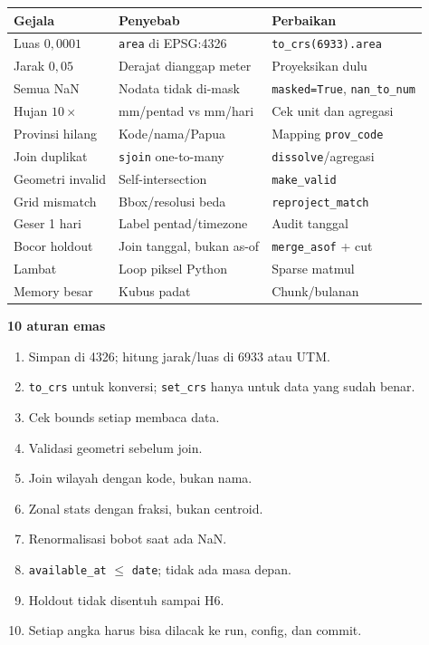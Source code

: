 \documentclass[9pt,a4paper]{extarticle}
\newcommand{\code}[1]{\texttt{\small\color{ink}#1}}
\newcommand{\thead}[1]{\textbf{\color{ink}#1}}
\newenvironment{csbox}[1]
  {\begin{tcolorbox}[enhanced,breakable,colback=tealbg,colframe=tealbg,boxrule=0pt,arc=1.1mm,
    left=3mm,right=2.2mm,top=1.4mm,bottom=1.4mm,borderline west={2.2pt}{0pt}{accent},
    before skip=3pt,after skip=3pt]
   \textcolor{accent}{\sffamily\bfseries #1}\par\vspace{0.5pt}}
  {\end{tcolorbox}}
\begin{document}
\begin{center}
\footnotesize
\begin{tabularx}{\linewidth}{@{}>{\RaggedRight\arraybackslash}p{4.1cm}>{\RaggedRight\arraybackslash}p{5.0cm}>{\RaggedRight\arraybackslash}X@{}}
\toprule
\rowcolor{bg}\thead{Gejala} & \thead{Penyebab} & \thead{Perbaikan}\\
\midrule
Luas $0{,}0001$ & \code{area} di EPSG:4326 & \code{to\_crs(6933).area}\\
Jarak $0{,}05$ & Derajat dianggap meter & Proyeksikan dulu\\
Semua NaN & Nodata tidak di-mask & \code{masked=True}, \code{nan\_to\_num}\\
Hujan $10\times$ & mm/pentad vs mm/hari & Cek unit dan agregasi\\
Provinsi hilang & Kode/nama/Papua & Mapping \code{prov\_code}\\
Join duplikat & \code{sjoin} one-to-many & \code{dissolve}/agregasi\\
Geometri invalid & Self-intersection & \code{make\_valid}\\
Grid mismatch & Bbox/resolusi beda & \code{reproject\_match}\\
Geser 1 hari & Label pentad/timezone & Audit tanggal\\
Bocor holdout & Join tanggal, bukan as-of & \code{merge\_asof} + cut\\
Lambat & Loop piksel Python & Sparse matmul\\
Memory besar & Kubus padat & Chunk/bulanan\\
\bottomrule
\end{tabularx}
\end{center}

\begin{csbox}{10 aturan emas}
\begin{enumerate}[leftmargin=1.15em,itemsep=0.1pt,topsep=0.5pt]
  \item Simpan di 4326; hitung jarak/luas di 6933 atau UTM.
  \item \code{to\_crs} untuk konversi; \code{set\_crs} hanya untuk data yang sudah benar.
  \item Cek bounds setiap membaca data.
  \item Validasi geometri sebelum join.
  \item Join wilayah dengan kode, bukan nama.
  \item Zonal stats dengan fraksi, bukan centroid.
  \item Renormalisasi bobot saat ada NaN.
  \item \code{available\_at} $\le$ \code{date}; tidak ada masa depan.
  \item Holdout tidak disentuh sampai H6.
  \item Setiap angka harus bisa dilacak ke run, config, dan commit.
\end{enumerate}
\end{csbox}
\end{document}
